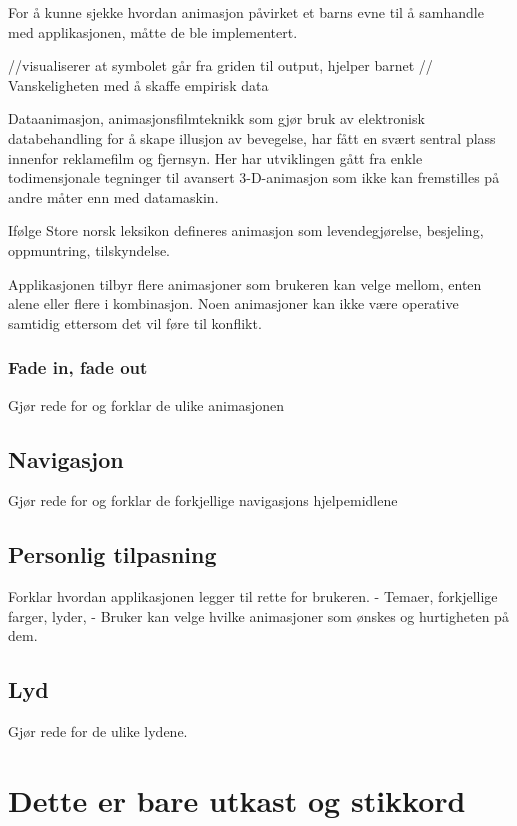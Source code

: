 \documentclass[phd,tocprelim]{cornell}
\begin{document}
For å kunne sjekke hvordan animasjon påvirket et barns evne til å samhandle med applikasjonen, måtte de ble implementert.  

//visualiserer at symbolet går fra griden til output, hjelper barnet
// Vanskeligheten med å skaffe empirisk data


Dataanimasjon, animasjonsfilmteknikk som gjør bruk av elektronisk databehandling for å skape illusjon av bevegelse, har fått en svært sentral plass innenfor reklamefilm og fjernsyn. Her har utviklingen gått fra enkle todimensjonale tegninger til avansert 3-D-animasjon som ikke kan fremstilles på andre måter enn med datamaskin.

Ifølge Store norsk leksikon defineres animasjon som levendegjørelse, besjeling, oppmuntring, tilskyndelse. 


Applikasjonen tilbyr flere animasjoner som brukeren kan velge mellom, enten alene eller flere i kombinasjon. Noen animasjoner kan ikke være operative samtidig ettersom det vil føre til konflikt. 

\subsection{Fade in, fade out}

Gjør rede for og forklar de ulike animasjonen

\section{Navigasjon}
Gjør rede for og forklar de forkjellige navigasjons hjelpemidlene

\section{Personlig tilpasning}
Forklar hvordan applikasjonen legger til rette for brukeren.
    - Temaer, forkjellige farger, lyder, 
    - Bruker kan velge hvilke animasjoner som ønskes og hurtigheten på dem.
    
\section{Lyd}
    Gjør rede for de ulike lydene.










\chapter{Dette er bare utkast og stikkord}
\end{document}
